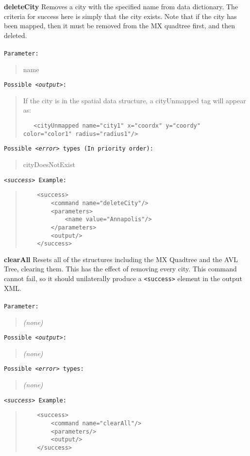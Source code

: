 \documentclass[12pt]{article}
\newenvironment{Description}
   {\begin{list}{}{\let\makelabel\Descriptionlabel
      \setlength\leftmargin{\labelwidth+\labelsep}
      \setlength\itemindent{-0.3em}}}%
   {\end{list}}
\newcommand*{\Descriptionlabel}[1]{%
  \parbox[b]{\labelwidth}
  {\makebox[0pt][l]{\textbf{#1}}\\}
  \hfill}
\begin{document}
\begin{Description}
\begin{Description}
	\item[\textbf{deleteCity}]
	 Removes a city with the specified name from data dictionary. The criteria for success here is simply that the
   city exists. Note that if the city has been mapped, then it must be
   removed from the MX quadtree first, and then deleted.\\\\
	\texttt{Parameter:}
	\begin{quote}
		name
	\end{quote}
	\texttt{Possible \emph{<output>}:}
	\begin{quote}
   If the city is in the spatial data structure, a cityUnmapped tag will
   appear as:
\begin{verbatim}
   <cityUnmapped name="city1" x="coordx" y="coordy" color="color1" radius="radius1"/> 
\end{verbatim}
	\end{quote}
	\texttt{Possible \emph{<error>} types (In priority order):}
	\begin{quote}
		cityDoesNotExist
	\end{quote}
   \texttt{\emph{<success>} Example:}
	\begin{quote}
	\begin{verbatim}
	<success>
	    <command name="deleteCity"/>
	    <parameters>
	        <name value="Annapolis"/>
	    </parameters>
	    <output/>
	</success>
	\end{verbatim}
	\end{quote}

	\item[\textbf{clearAll}]
	Resets all of the structures including the MX Quadtree and the AVL Tree, clearing them.
  	This has the effect of removing every city.  This
  	command cannot fail, so it should unilaterally produce a
	\texttt{<success>} element in the output XML.\\\\	
	\texttt{Parameter:}
	\begin{quote}
		\emph{(none)}
	\end{quote}
	\texttt{Possible \emph{<output>}:}
	\begin{quote}
		\emph{(none)}
	\end{quote}
	\texttt{Possible \emph{<error>} types:}
	\begin{quote}
		\emph{(none)}
	\end{quote}
	\texttt{\emph{<success>} Example:}
	\begin{quote}
	\begin{verbatim}
	<success>
	    <command name="clearAll"/>
	    <parameters/>
	    <output/>
	</success>
	\end{verbatim}
	\end{quote}	


\end{Description}
\end{Description}
\end{document}
